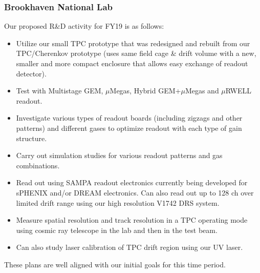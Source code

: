 \subsubsection{Brookhaven National Lab} 

Our proposed R\&D activity for FY19 is as follows:

\begin{itemize}
\item Utilize our small TPC prototype that was redesigned and rebuilt from our TPC/Cherenkov prototype (uses same field cage \& drift volume with a new, smaller and more compact enclosure that allows easy exchange of readout detector).
\item Test with Multistage GEM, $\mu$Megas, Hybrid GEM+$\mu$Megas and $\mu$RWELL readout.
\item Investigate various types of readout boards (including zigzags and other patterns) and different gases to optimize readout with each type of gain structure.
\item Carry out simulation studies for various readout patterns and gas combinations. 
\item Read out using SAMPA readout electronics currently being developed for sPHENIX and/or DREAM electronics.  Can also read out up to 128 ch  over limited drift range using our high resolution V1742 DRS system.
\item Measure spatial resolution and track resolution in a TPC operating mode using cosmic ray telescope in the lab and then in the test beam.
\item Can also study laser calibration of TPC drift region using our UV laser.

\end{itemize}

These plans are well aligned with our initial goals for this time period.